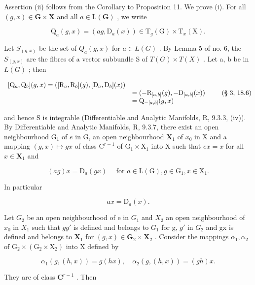 Assertion (ii) follows from the Corollary to Proposition 11. We prove (i). For all \((g, x) \in \mathbf{G} \times \mathbf{X}\) and all \(a \in \mathrm{L}(\mathbf{G})\) , we write

\[
\mathrm{Q} _ {a} (g, x) = (a g, \mathrm{D} _ {a} (x)) \in \mathrm{T} _ {g} (\mathrm{G}) \times \mathrm{T} _ {x} (\mathrm{X}).
\]

Let \(S_{(g,x)}\) be the set of \(Q_{a}(g,x)\) for \(a\in L(G)\) . By Lemma 5 of no. 6, the \(S_{(g,x)}\) are the fibres of a vector subbundle S of \(T(G)\times T(X)\) . Let a, b be in \(L(G)\) ; then

\[
\begin{array}{r l} {[ \mathrm{Q} _ {a}, \mathrm{Q} _ {b} ] (g, x) = ([ \mathrm{R} _ {a}, \mathrm{R} _ {b} ] (g), [ \mathrm{D} _ {a}, \mathrm{D} _ {b} ] (x))} \\ & = (- \mathrm{R} _ {[ a, b ]} (g), - \mathrm{D} _ {[ a, b ]} (x)) \\ & = \mathrm{Q} _ {- [ a, b ]} (g, x) \end{array}\tag{§ 3, 18.6}
\]

and hence S is integrable (Differentiable and Analytic Manifolds, R, 9.3.3, (iv)). By Differentiable and Analytic Manifolds, R, 9.3.7, there exist an open neighbourhood \(\mathrm{G}_1\) of \(e\) in G, an open neighbourhood \(\mathbf{X}_1\) of \(x_0\) in X and a mapping \((g,x)\mapsto gx\) of class \(\mathrm{C}^{r - 1}\) of \(\mathrm{G}_1\times \mathrm{X}_1\) into X such that \(ex = x\) for all \(x\in \mathbf{X}_1\) and

\[
(a g) x = \mathrm{D} _ {a} (g x) \quad \text { for } a \in \mathrm{L} (\mathrm{G}), g \in \mathrm{G} _ {1}, x \in \mathrm{X} _ {1}.\tag{6}
\]

In particular

\[
a x = \mathrm{D} _ {a} (x).\tag{7}
\]

Let \(G_{2}\) be an open neighbourhood of e in \(G_{1}\) and \(X_{2}\) an open neighbourhood of \(x_{0}\) in \(X_{1}\) such that \(gg'\) is defined and belongs to \(G_{1}\) for g, \(g'\) in \(G_{2}\) and gx is defined and belongs to \(\mathbf{X}_1\) for \((g,x)\in \mathbf{G}_2\times \mathbf{X}_2\) . Consider the mappings \(\alpha_{1},\alpha_{2}\) of \(\mathrm{G}_2\times (\mathrm{G}_2\times \mathrm{X}_2)\) into X defined by

\[
\alpha_ {1} (g, (h, x)) = g (h x), \quad \alpha_ {2} (g, (h, x)) = (g h) x.
\]

They are of class \(\mathbf{C}^{r - 1}\) . Then

